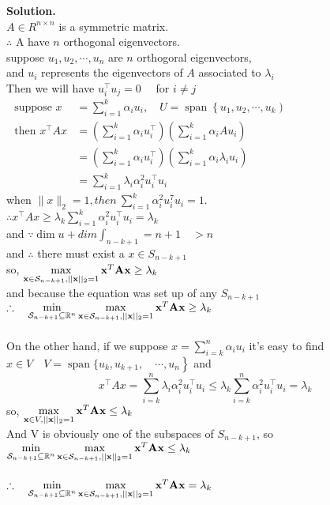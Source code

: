 \documentclass[english,onecolumn]{IEEEtran}
\newcommand{\Rbb}{\mathbb{R}}
\newcommand{\bigS}{\mathcal{S}}
\newcommand{\bA}{{\bf A}}
\newcommand{\bx}{{\bf x}}
\begin{document}
\noindent
\textbf{Solution.}\\
$A \in R^{n\times n}$ is a symmetric matrix. \\
$\therefore$ A have $n$ orthogonal eigenvectors.\\
suppose $u_{1}, u_{2}, \cdots, u_{n}$ are $n$ orthogoral
eigenvectors,\\
and $u_i$  represents the eigenvectors of $A$ associated to $\lambda_{i}$\\
Then we will have $u_{i}^{\top} u_{j}=0 \quad$ for $i \neq j$\\
$\begin{aligned} \text { suppose } x &=\sum_{i=1}^{k} \alpha_{i} u_{i}, \quad U=\operatorname{span}\left\{u_{1}, u_{2}, \cdots, u_{k}\right) \\ \text { then } x^{\top} A x &=\left(\sum_{i=1}^{k} \alpha_{i} u_{i}^{\top}\right)\left(\sum_{i=1}^{k} \alpha_{i} A u_{i}\right) \\ &=\left(\sum_{i=1}^{k} \alpha_{i} u_{i}^{\top}\right)\left(\sum_{i=1}^{k} \alpha_{i} \lambda_{i} u_{i}\right) \\ &=\sum_{i=1}^{k} \lambda_{i} \alpha_{i}^{2} u_{i}^{\top} u_{i} \end{aligned}$\\
when $\|x \|_{2}=1, then \ \sum_{i=1}^{k} \alpha_{i}^{2} u_{i}^{7} u_{i}=1.$\\
$\therefore x^{\top} A x \geqslant \lambda_{k} \sum_{i=1}^{k} \alpha_{i}^{2} u_{i}^{\top} u_{i}=\lambda_{k}$\\
and $\because \operatorname{dim} u+d i m \int_{n-k+1}=n+1 \quad>n$\\
and $\therefore$ there must exist a $x \in S_{n-k+1}$ \\
so, $\max\limits_{\bx\in\bigS_{n-k+1},||\bx||_2=1} \bx^T\bA\bx\ge \lambda_k$\\
and because the equation was set up of any $S_{n-k+1}$\\
$\therefore \quad \min\limits_{\bigS_{n-k+1}\subseteq \Rbb^n}\max\limits_{\bx\in\bigS_{n-k+1},||\bx||_2=1} \bx^T\bA\bx\ge \lambda_k$\\\\

On the other hand, if we suppose $x=\sum_{i=k}^{n} \alpha_{i} u_{i}$
it's easy to find $\left.x \in V\quad V=\operatorname{span} \{ u_{k}, u_{k+1}, \quad \cdots, u_{n}\right\}$ and
$$
x^{\top} A x=\sum_{i=k}^{n} \lambda_{i} \alpha_{i}^{2} u_{i}^{\top} u_{i} \leq \lambda_{k} \sum_{i=k}^{n} \alpha_{i}^{2} u_{i}^{\top} u_{i}=\lambda_{k}
$$
so, $\max\limits_{\bx\in V,||\bx||_2=1} \bx^T\bA\bx\leq \lambda_k$\\
And V is obviously one of the subspaces of $S_{n-k+1}$, so\\
$\min\limits_{\bigS_{n-k+1}\subseteq \Rbb^n}\max\limits_{\bx\in\bigS_{n-k+1},||\bx||_2=1} \bx^T\bA\bx\leq \lambda_k$
\\\\
$\therefore \quad \min\limits_{\bigS_{n-k+1}\subseteq \Rbb^n}\max\limits_{\bx\in\bigS_{n-k+1},||\bx||_2=1} \bx^T\bA\bx= \lambda_k$
\end{document}
